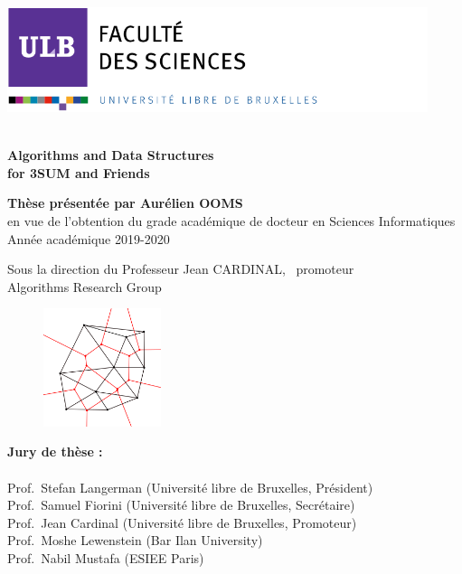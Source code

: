 \documentclass[b5paper,12pt]{article}
\newcommand\blankpage{%
    \null
    \thispagestyle{empty}%
    \addtocounter{page}{-1}%
    \newpage}
\begin{document}
\includegraphics[width=12.3cm, height=3.07cm]{sciences.png} \\ \\

\begin{tcolorbox}
\color[rgb]{1,1,1}

\Large{\textbf{Algorithms and Data Structures\\ for 3SUM and Friends}}
\end{tcolorbox}

\begin{tcolorbox}[colback=white, halign=left]
\color{darkblue}
\large{\textbf{Thèse présentée par Aurélien OOMS}} \\
\color{black}
\small{en vue de l'obtention du grade académique de docteur en Sciences Informatiques \\
Année académique 2019-2020}

\vspace{2cm}

\begin{flushright}
\color{darkblue}
Sous la direction du Professeur Jean CARDINAL, \ promoteur  \\
\color{black}
Algorithms Research Group
\end{flushright}
\end{tcolorbox}
\vspace{4cm}


\begin{figure}
\includegraphics[width=3.45cm]{algorithms.png}
\end{figure}
\noindent
\textbf{Jury de thèse : } \\  \\
Prof.~Stefan Langerman (Université libre de Bruxelles, Président) \\
Prof.~Samuel Fiorini (Université libre de Bruxelles, Secrétaire) \\
Prof.~Jean Cardinal (Université libre de Bruxelles, Promoteur) \\
Prof.~Moshe Lewenstein (Bar Ilan University) \\
Prof.~Nabil Mustafa (ESIEE Paris) \\

\afterpage{\blankpage}
\end{document}
